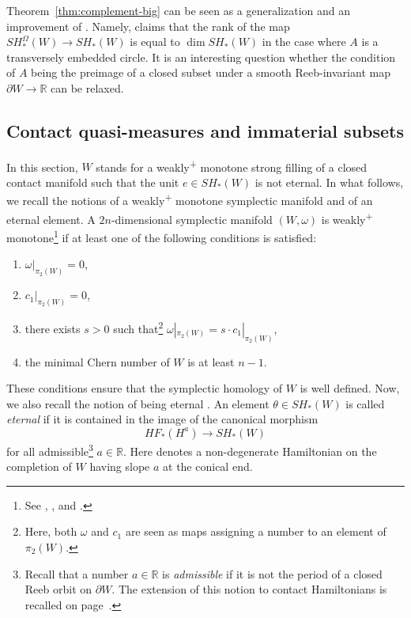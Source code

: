 \documentclass[10pt,a4paper]{amsart}
\numberwithin{equation}{section}
\theoremstyle{definition}
\begin{document}
Theorem~\ref{thm:complement-big} can be seen as a generalization and an improvement of \cite[Theorem~7.4]{uljarevic2023selective}. {Namely, \cite[Theorem~7.4]{uljarevic2023selective} claims that the rank of the map $SH^{\Omega}_\ast(W)\to SH_\ast(W)$ is equal to $\dim SH_\ast(W)$ in the case where $A$ is a transversely embedded circle. It is an interesting question whether the condition of $A$ being the preimage of a closed subset under a smooth Reeb-invariant map~${\partial W\to \mathbb{R}}$ can be relaxed.}

\subsection{Contact quasi-measures and immaterial subsets}

In this section, $W$ stands for a weakly\textsuperscript{+} monotone strong filling of a closed contact manifold such that the unit $e\in SH_\ast(W)$ is not eternal. {In what follows, we recall the notions of a weakly\textsuperscript{+} monotone symplectic manifold and of an eternal element. A} $2n$-dimensional symplectic manifold $(W, \omega)$ is weakly\textsuperscript{+} monotone\footnote{ See \cite[Lemma~1.1]{hofer1995floer}, \cite[Assumption ($W^+$)]{seidel1997pi_1}, and \cite[Section~2B]{ritter2016circle}.} if at least one of the following conditions is satisfied:
\begin{enumerate}\itemsep=0pt
\item[(1)] $ \omega |_{\pi_2(W)}=0$,
\item[(2)] $ c_1 |_{\pi_2(W)}=0$,
\item[(3)] there exists $s>0$ such that\footnote{Here, both $\omega$ and $c_1$ are seen as maps assigning a number to an element of $\pi_2(W)$.} $ \omega |_{\pi_2(W)}= s\cdot c_1 |_{\pi_2(W)}$,
\item[(4)] the minimal Chern number of $W$ is at least $n-1$.
\end{enumerate}
These conditions ensure that the symplectic homology of $W$ is well defined. Now, we also recall the notion of being eternal \cite{cant2024remarks}. An element $\theta\in SH_\ast(W)$ is called {\emph{eternal}} if it is contained in the image of the canonical morphism
\[ HF_\ast(H^a)\to SH_\ast(W) \]
for all admissible\footnote{{Recall that a number $a\in\mathbb{R}$ is \emph{admissible} if it is not the period of a closed Reeb orbit on $\partial W$. The extension of this notion to contact Hamiltonians is recalled on page~\pageref{def:admissible}}.} $a\in \mathbb{R}$. Here  denotes a non-degenerate Hamiltonian on the completion  of $W$ having slope $a$ at the conical end.
\end{document}
